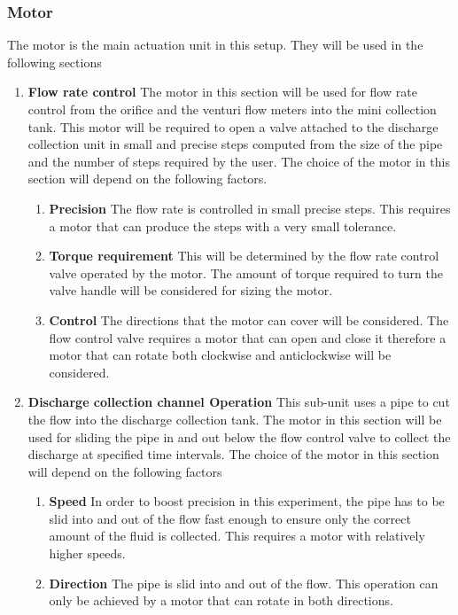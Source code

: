 \subsubsection{Motor}
The motor is the main actuation unit in this setup. They will be used in the following sections
\begin{enumerate}
    \item \textbf{Flow  rate control} \newline
    The motor in this section will be used for flow rate control from the orifice and the venturi flow meters into the mini collection tank. This motor will be required to open a valve attached to the discharge collection unit in small and precise steps computed from the size of the pipe and the number of steps required by the user. The choice of the motor in this section will depend on the following factors.
    \begin{enumerate}
        \item \textbf{Precision}  \newline
        The flow rate is controlled in small precise steps. This requires a motor that can produce the steps with a very small tolerance.
        \item \textbf{Torque requirement} \newline
        This will be determined by the flow rate control valve operated by the motor. The amount of torque required to turn the valve handle will be considered for sizing the motor.
        \item \textbf{Control}  \newline
        The directions that the motor can cover will be considered. The flow control valve requires a motor that can open and close it therefore a motor that can rotate both clockwise and anticlockwise will be considered.
    \end{enumerate}
    \item \textbf{Discharge collection channel Operation}  \newline
    This sub-unit uses a pipe to cut the flow into the discharge collection tank. The motor in this section will be used for sliding the pipe in and out below the flow control valve to collect the discharge at specified time intervals. The choice of the motor in this section will depend on the following factors
    \begin{enumerate}
        \item \textbf{Speed} \newline
        In order to boost precision in this experiment, the pipe has to be slid into and out of the flow fast enough to ensure only the correct amount of the fluid is collected. This requires a motor with relatively higher speeds.
        \item \textbf{Direction} \newline
        The pipe is slid into and out of the flow. This operation can only be achieved by a motor that can rotate in both directions.
    \end{enumerate}
\end{enumerate}

